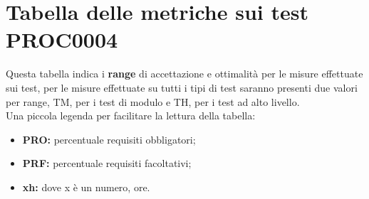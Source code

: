 \documentclass[PianoDiQualifica.tex]{subfiles}
\begin{document}
\section{Tabella delle metriche sui test PROC0004}
Questa tabella indica i \textbf{range} di accettazione e ottimalità per le misure effettuate sui test, per le misure effettuate su tutti i tipi di test saranno presenti due valori per range, TM, per i test di modulo e TH, per i test ad alto livello.\\
Una piccola legenda per facilitare la lettura della tabella: \\
\begin{itemize}
	\item \textbf{PRO:} percentuale requisiti obbligatori;
	\item \textbf{PRF:} percentuale requisiti facoltativi;
	\item \textbf{xh:} dove x è un numero, ore.
\end{itemize}
\end{document}
